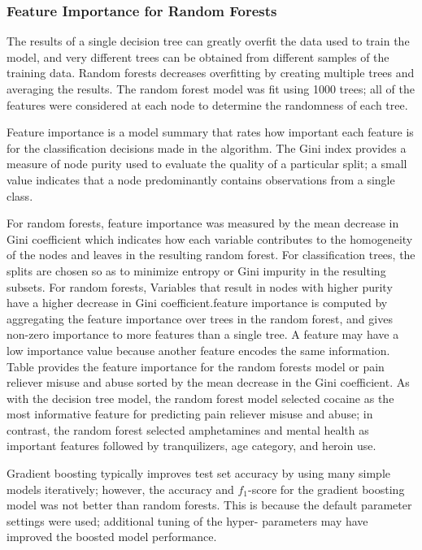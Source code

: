 \documentclass[sigconf]{acmart}
\begin{document}
\subsubsection{Feature Importance for Random Forests}

The results of a single decision tree can greatly overfit the data used
to train the model, and very different trees can be obtained from different
samples of the training data. Random forests decreases overfitting by
creating multiple trees and averaging the results. The random forest model 
was fit using 1000 trees; all of the features were considered at each node 
to determine the randomness of each tree. 


Feature importance is a model summary that rates how important each feature is 
for the classification decisions made in the algorithm. 
The Gini index provides a measure of node purity used to evaluate
the quality of a particular split; a small value indicates that a node 
predominantly contains observations from a single class. 

For random forests, 
feature importance was measured by the mean decrease in Gini coefficient 
which indicates how each variable contributes to the homogeneity of the nodes 
and leaves in the resulting random forest. For classification trees, the splits 
are chosen so as to minimize entropy or Gini impurity in the resulting subsets.
For random forests, Variables that result in nodes with higher purity have a 
higher decrease in Gini coefficient.feature importance is computed by 
aggregating the feature importance over trees in the random forest, and gives 
non-zero importance to more features than a single tree.  A feature may have 
a low importance value because another feature encodes the same information. 
Table  provides the feature importance for the random forests model or pain 
reliever misuse and abuse sorted by the mean decrease in the Gini coefficient. 
As with the decision tree model, the random forest model selected cocaine as
the most informative feature for predicting pain reliever misuse and abuse; 
in contrast, the random forest selected amphetamines and mental health as
important features followed by tranquilizers, age category, and heroin use. 

Gradient boosting typically improves test set accuracy by using many simple
models iteratively; however, the accuracy and $f_1$-score for the gradient 
boosting model was not better than random forests. This is because the 
default parameter settings were used; additional tuning of the hyper-
parameters may have improved the boosted model performance.
\end{document}
